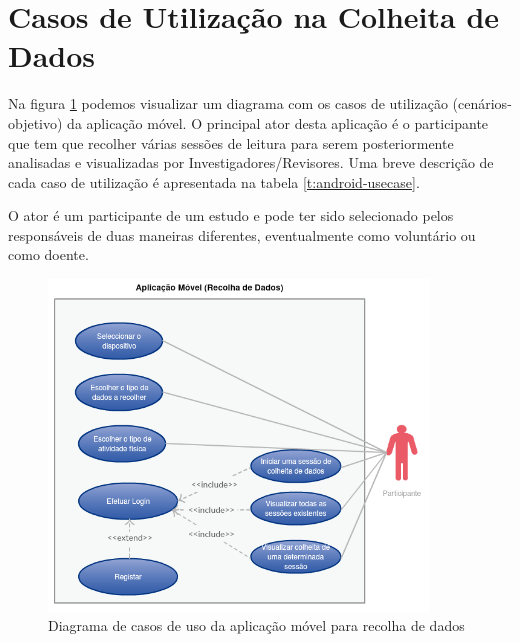 \section{Casos de Utilização na Colheita de Dados}

Na figura \ref{f:usecaseandroidapp} podemos visualizar um diagrama com os casos de utilização (cenários-objetivo) da aplicação móvel. O principal ator desta aplicação é o participante que tem que recolher várias sessões de leitura para serem posteriormente analisadas e visualizadas por Investigadores/Revisores.  Uma breve descrição de cada caso de utilização é apresentada na tabela \ref{t:android-usecase}.
\par
O ator é um participante de um estudo e pode ter sido selecionado pelos responsáveis de duas maneiras diferentes, eventualmente como voluntário ou como doente. 

\begin{figure}[H]
  \centering
  \includegraphics[width=0.9\textwidth]{imgs/app-and-usecase.png}
  \caption[Diagrama de casos de uso da aplicação móvel para recolha de dados]{Diagrama de casos de uso da aplicação móvel para recolha de dados}
  
  \label{f:usecaseandroidapp}
\end{figure}

\newpage


